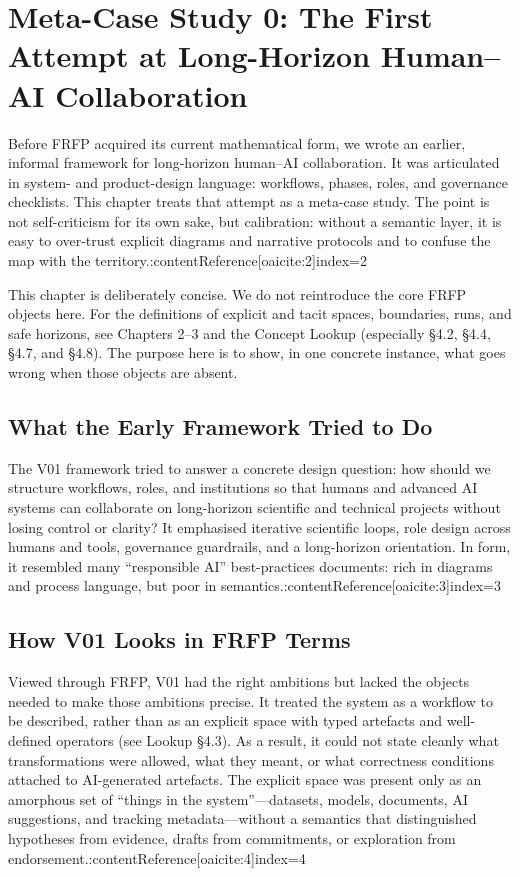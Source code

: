
\chapter{Meta-Case Study 0: The First Attempt at Long-Horizon Human--AI Collaboration}

Before FRFP acquired its current mathematical form, we wrote an earlier, informal framework for long-horizon human--AI collaboration. It was articulated in system- and product-design language: workflows, phases, roles, and governance checklists. This chapter treats that attempt as a meta-case study. The point is not self-criticism for its own sake, but calibration: without a semantic layer, it is easy to over-trust explicit diagrams and narrative protocols and to confuse the map with the territory.:contentReference[oaicite:2]{index=2}

This chapter is deliberately concise. We do not reintroduce the core FRFP objects here. For the definitions of explicit and tacit spaces, boundaries, runs, and safe horizons, see Chapters 2--3 and the Concept Lookup (especially \S4.2, \S4.4, \S4.7, and \S4.8). The purpose here is to show, in one concrete instance, what goes wrong when those objects are absent.

\section{What the Early Framework Tried to Do}

The V01 framework tried to answer a concrete design question: how should we structure workflows, roles, and institutions so that humans and advanced AI systems can collaborate on long-horizon scientific and technical projects without losing control or clarity? It emphasised iterative scientific loops, role design across humans and tools, governance guardrails, and a long-horizon orientation. In form, it resembled many ``responsible AI'' best-practices documents: rich in diagrams and process language, but poor in semantics.:contentReference[oaicite:3]{index=3}

\section{How V01 Looks in FRFP Terms}

Viewed through FRFP, V01 had the right ambitions but lacked the objects needed to make those ambitions precise. It treated the system as a workflow to be described, rather than as an explicit space with typed artefacts and well-defined operators (see Lookup \S4.3). As a result, it could not state cleanly what transformations were allowed, what they meant, or what correctness conditions attached to AI-generated artefacts. The explicit space was present only as an amorphous set of ``things in the system''---datasets, models, documents, AI suggestions, and tracking metadata---without a semantics that distinguished hypotheses from evidence, drafts from commitments, or exploration from endorsement.:contentReference[oaicite:4]{index=4}

